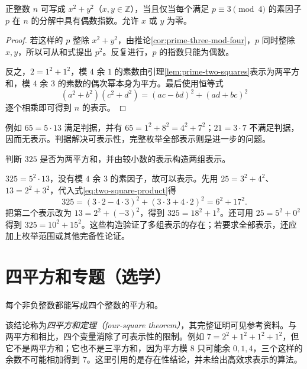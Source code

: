 \begin{theorem}
\label{thm:two-squares}
正整数 $n$ 可写成 $x^2+y^2$（$x,y\in\mathbb Z$），当且仅当每个满足 $p\equiv3\pmod4$ 的素因子 $p$ 在 $n$ 的分解中具有偶数指数。允许 $x$ 或 $y$ 为零。
\end{theorem}
\begin{proof}
若这样的 $p$ 整除 $x^2+y^2$，由推论\ref{cor:prime-three-mod-four}，$p$ 同时整除 $x,y$，所以可从和式提出 $p^2$。反复进行，$p$ 的指数只能为偶数。

反之，$2=1^2+1^2$，模 $4$ 余 $1$ 的素数由引理\ref{lem:prime-two-squares}表示为两平方和，模 $4$ 余 $3$ 的素数的偶次幂本身为平方。最后使用恒等式
\begin{equation}
 (a^2+b^2)(c^2+d^2)=(ac-bd)^2+(ad+bc)^2
 \label{eq:two-square-product}
\end{equation}
逐个相乘即可得到 $n$ 的表示。
\end{proof}

例如 $65=5\cdot13$ 满足判据，并有 $65=1^2+8^2=4^2+7^2$；$21=3\cdot7$ 不满足判据，因而无表示。判据解决可表示性，完整枚举全部表示则是进一步的问题。

\begin{example}[从判据走向构造]
判断 $325$ 是否为两平方和，并由较小数的表示构造两组表示。
\end{example}
\begin{solve}
$325=5^2\cdot13$，没有模 $4$ 余 $3$ 的素因子，故可以表示。先用 $25=3^2+4^2$、$13=2^2+3^2$，代入式\eqref{eq:two-square-product}得
\[
 325=(3\cdot2-4\cdot3)^2+(3\cdot3+4\cdot2)^2=6^2+17^2.
\]
把第二个表示改为 $13=2^2+(-3)^2$，得到 $325=18^2+1^2$。还可用 $25=5^2+0^2$ 得到 $325=10^2+15^2$。这些构造验证了多组表示的存在；若要求全部表示，还应加上枚举范围或其他完备性论证。
\end{solve}

\section{四平方和专题（选学）}

\begin{theorem}
每个非负整数都能写成四个整数的平方和。
\end{theorem}

该结论称为\emph{四平方和定理（four-square theorem）}，其完整证明可见参考资料\cite{mit-four-squares}。与两平方和相比，四个变量消除了可表示性的限制。例如 $7=2^2+1^2+1^2+1^2$，但它不是两平方和；它也不是三平方和，因为平方模 $8$ 只可能余 $0,1,4$，三个这样的余数不可能相加得到 $7$。这里引用的是存在性结论，并未给出高效求表示的算法。


